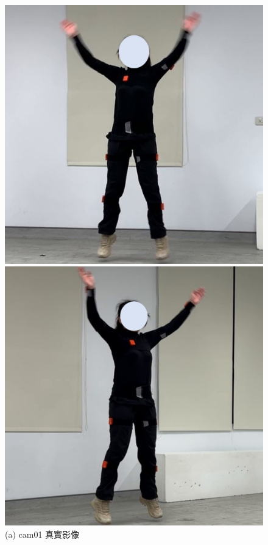 \begin{figure}[!ht]
   \centering
   \begin{minipage}{.5\textwidth}
      \centering
      \includegraphics[width=.95\linewidth]{figure/ch4_fig_jump_cam01_with1.jpg}
      \caption*{(a) cam01 真實影像}
    \end{minipage}%
    \begin{minipage}{.5\textwidth}
       \centering
       \includegraphics[width=.95\linewidth]{figure/ch4_fig_jump_cam02_with1.jpg}

\end{minipage}
\end{figure}
